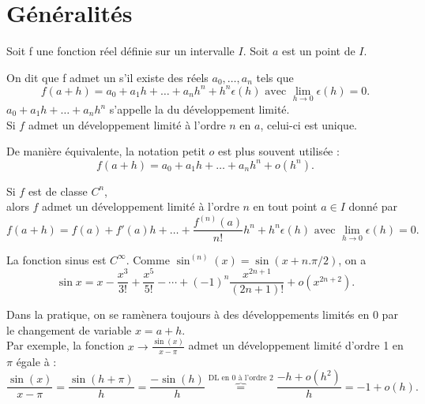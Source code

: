 \documentclass{book}
\begin{document}
\section{Généralités}
Soit f une fonction réel définie sur un intervalle $I$. Soit $a$ est un point de $I$.
\begin{DefinitionProposition}
On dit que f admet un  s'il existe des réels $a_0,\dots,a_n$ tels que
$$ f(a+h)=a_0+a_1 h+\dots +a_n h^n+h^n\epsilon(h) \text{ avec }
 \lim _{h\rightarrow 0}\epsilon(h)=0.$$
$a_0+a_1 h+\dots +a_n h^n$ s'appelle la  du développement limité.\\ 
Si $f$ admet un développement limité à l'ordre $n$ en $a$, celui-ci est unique.
\end{DefinitionProposition}
\begin{Remarque}
De manière équivalente, la notation petit $o$ est plus souvent utilisée :
$$ f(a+h)=a_0+a_1 h+\dots +a_n h^n+o(h^n).$$
\end{Remarque}
\begin{Proposition}
Si $f$ est de classe $C^n$,\\
alors $f$ admet un développement limité à l'ordre $n$ en tout point $a\in I$ donné par
$$ f(a+h)=f(a)+f'(a) h+\dots +\frac{f^{(n)}(a)}{n!} h^n+h^n\epsilon(h) \text{ avec }
 \lim _{h\rightarrow 0}\epsilon(h)=0.$$
\end{Proposition}
\begin{Exemple}[Sinus]
La fonction sinus est $C^\infty$. Comme $\sin^{(n)}(x)=\sin (x + n. \pi/2)$, on a
$$\sin x=x-{\frac {x^{3}}{3!}}+{\frac {x^{5}}{5!}}-\cdots +(-1)^{n}{\frac {x^{2n+1}}{(2n+1)!}}+o(x^{2n+2}).$$
\end{Exemple}
\begin{Remarque}[Au voisinage de $0$]
Dans la pratique, on se ramènera toujours à des développements limités en $0$ par le changement de
variable $x=a+h$. \\
Par exemple, la fonction $x\to\frac{\sin(x)}{x-\pi}$ admet un développement limité d'ordre 1 en $\pi$ égale à :
 $$\frac{\sin(x)}{x-\pi}=\frac{\sin(h+\pi)}{h}=\frac{-\sin(h)}{h}\overbrace{=}^{\text{DL en 0 à l'ordre 2}}\frac{-h+o(h^2)}{h}=-1+o(h).$$
\end{Remarque}
\end{document}
